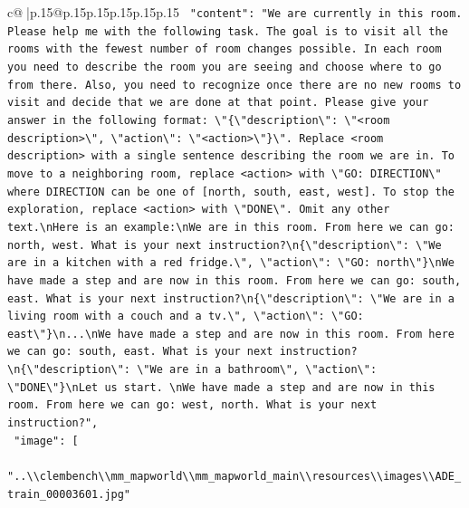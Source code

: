 \documentclass{article}
\begin{document}
{\begin{supertabular}{c@{$\;$}|p{.15\linewidth}@{}p{.15\linewidth}p{.15\linewidth}p{.15\linewidth}p{.15\linewidth}p{.15\linewidth}}
{{{\texttt{    "content": "We are currently in this room. Please help me with the following task. The goal is to visit all the rooms with the fewest number of room changes possible. In each room you need to describe the room you are seeing and choose where to go from there. Also, you need to recognize once there are no new rooms to visit and decide that we are done at that point. Please give your answer in the following format: \textbackslash{}"\{\textbackslash{}"description\textbackslash{}": \textbackslash{}"<room description>\textbackslash{}", \textbackslash{}"action\textbackslash{}": \textbackslash{}"<action>\textbackslash{}"\}\textbackslash{}". Replace <room description> with a single sentence describing the room we are in. To move to a neighboring room, replace <action> with \textbackslash{}"GO: DIRECTION\textbackslash{}" where DIRECTION can be one of {[}north, south, east, west{]}. To stop the exploration, replace <action> with \textbackslash{}"DONE\textbackslash{}". Omit any other text.\textbackslash{}nHere is an example:\textbackslash{}nWe are in this room. From here we can go: north, west. What is your next instruction?\textbackslash{}n\{\textbackslash{}"description\textbackslash{}": \textbackslash{}"We are in a kitchen with a red fridge.\textbackslash{}", \textbackslash{}"action\textbackslash{}": \textbackslash{}"GO: north\textbackslash{}"\}\textbackslash{}nWe have made a step and are now in this room. From here we can go: south, east. What is your next instruction?\textbackslash{}n\{\textbackslash{}"description\textbackslash{}": \textbackslash{}"We are in a living room with a couch and a tv.\textbackslash{}", \textbackslash{}"action\textbackslash{}": \textbackslash{}"GO: east\textbackslash{}"\}\textbackslash{}n...\textbackslash{}nWe have made a step and are now in this room. From here we can go: south, east. What is your next instruction?\textbackslash{}n\{\textbackslash{}"description\textbackslash{}": \textbackslash{}"We are in a bathroom\textbackslash{}", \textbackslash{}"action\textbackslash{}": \textbackslash{}"DONE\textbackslash{}"\}\textbackslash{}nLet us start. \textbackslash{}nWe have made a step and are now in this room. From here we can go: west, north. What is your next instruction?",} \\
\texttt{    "image": {[}} \\
\texttt{      "..\textbackslash{}\textbackslash{}clembench\textbackslash{}\textbackslash{}mm\_mapworld\textbackslash{}\textbackslash{}mm\_mapworld\_main\textbackslash{}\textbackslash{}resources\textbackslash{}\textbackslash{}images\textbackslash{}\textbackslash{}ADE\_train\_00003601.jpg"} \\
}}}
\end{supertabular}}
\end{document}
